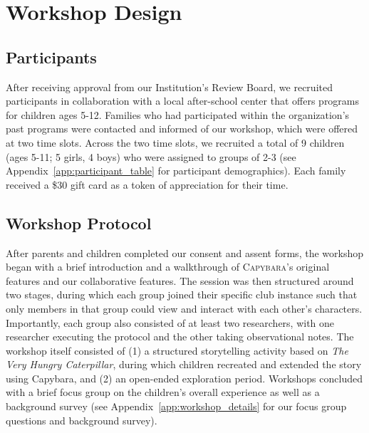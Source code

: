 \documentclass[sigconf,nonacm]{acmart}
\newcommand{\capybara}{\textsc{Capybara}\xspace}
\begin{document}

\section{Workshop Design}
\subsection{Participants} 
After receiving approval from our Institution's Review Board, we recruited participants in collaboration with a local after-school center that offers programs for children ages 5-12. Families who had participated within the organization's past programs were contacted and informed of our workshop, which were offered at two time slots. Across the two time slots, we recruited a total of 9 children (ages 5-11; 5 girls, 4 boys) who were assigned to groups of 2-3  (see  Appendix~\ref{app:participant_table} for participant demographics). Each family received a \$30 gift card as a token of appreciation for their time.

\subsection{Workshop Protocol} 
After parents and children completed our consent and assent forms, the workshop began with a brief introduction and a walkthrough of \capybara's original features and our collaborative features. The session was then structured around two stages, during which each group joined their specific club instance such that only members in that group could view and interact with each other's characters. Importantly, each group also consisted of at least two researchers, with one researcher executing the protocol and the other taking observational notes. The workshop itself consisted of (1) a structured storytelling activity based on \textit{The Very Hungry Caterpillar}, during which children recreated and extended the story using Capybara, and (2) an open-ended exploration period. Workshops concluded with a brief focus group on the children's overall experience as well as a background survey (see Appendix~\ref{app:workshop_details} for our focus group questions and background survey).
\end{document}
